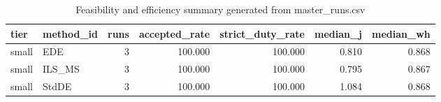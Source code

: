 \begin{table}[!t]
\centering
\caption{Feasibility and efficiency summary generated from master_runs.csv}
\label{tab:feasibility_summary_generated}
\begin{tabular}{llrrrrr}
\toprule
tier & method_id & runs & accepted_rate & strict_duty_rate & median_j & median_wh \\
\midrule
small & EDE & 3 & 100.000 & 100.000 & 0.810 & 0.868 \\
small & ILS_MS & 3 & 100.000 & 100.000 & 0.795 & 0.867 \\
small & StdDE & 3 & 100.000 & 100.000 & 1.084 & 0.868 \\
\bottomrule
\end{tabular}

\end{table}